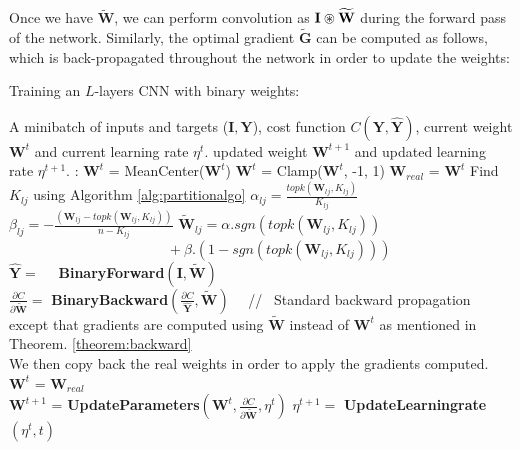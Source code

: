 \noindent Once we have $\widetilde{\mathbf{W}}$, we can perform convolution as $\bf{I} \circledast \widetilde{\mathbf{W}}$ during the forward pass of the network. Similarly, the optimal gradient $\widetilde{\mathbf{G}}$ can be computed as follows, which is back-propagated throughout the network in order to update the weights:

\begin{algorithm}[t]
{
  \caption{Training an $L$-layers CNN with binary weights:}
  \label{alg:trainbinconv}       
  \begin{algorithmic}[1]
  \State A minibatch of inputs and targets  ($\mathbf{I}, \mathbf{Y}$), cost function $C(\mathbf{Y},\hat{\mathbf{Y}})$, current weight $\mathbf{W}^t$ and current learning rate $\eta^t$.     
  \State updated weight $\mathbf{W}^{t+1}$ and updated learning rate $\eta^{t+1}$. 
  :
  \State $\mathbf{W}^t$ = MeanCenter($\mathbf{W}^t$)
  \State $\mathbf{W}^t$ = Clamp($\mathbf{W}^t$, -1, 1)
  \State $\mathbf{W}_{real}$ = $\mathbf{W}^t$
      	  \State Find $K_{lj}$ using Algorithm \ref{alg:partitionalgo}
          \State $\alpha_{lj}=\frac{topk(\mathbf{W}_{lj},K_{lj})}{K_{lj}}$
          \State $\beta_{lj}=-\frac{(\mathbf{W}_{lj}-topk(\mathbf{W}_{lj},K_{lj}))}{n-K_{lj}}$
          \State $\widetilde{\mathbf{W}}_{lj}=\alpha.sgn(topk(\mathbf{W}_{lj},K_{lj}))$ \\ \ \ \ \ \ \ \ \ \ \ \ \ \ \ \ \ \ \ \ \ \ \ \  $ + \ \beta.(1-sgn(topk(\mathbf{W}_{lj},K_{lj})))$
      \EndFor
   \EndFor
   \\
   \State $\hat{\mathbf{Y}}=$ ~~\textbf{BinaryForward}$(\mathbf{I},\widetilde{\mathbf{W}})$
   \\
   \State $\frac{\partial C}{\partial \widetilde{\mathbf{W}}} =$ \textbf{BinaryBackward}$(\frac{\partial C}{\hat{\mathbf{Y}}}, \widetilde{\mathbf{W}})$ ~~//~{ Standard backward propagation except that gradients are computed using $\widetilde{\mathbf{W}}$ instead of $\mathbf{W}^t$} as mentioned in Theorem. \ref{theorem:backward}
   \\
 \State We then copy back the real weights in order to apply the gradients computed. $\mathbf{W}^t$ = $\mathbf{W}_{real}$ \\
 \State $\mathbf{W}^{t+1}$ = \textbf{UpdateParameters}$(\mathbf{W}^{t},\frac{\partial C}{\partial \widetilde{\mathbf{W}}}, \eta^t)$ 
 \State $\eta^{t+1}=$ \textbf{UpdateLearningrate}$(\eta^t, t)$
  \end{algorithmic}
}
\end{algorithm}

